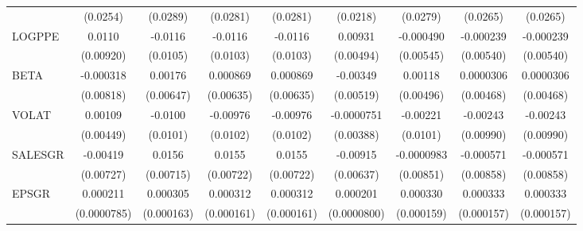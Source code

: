 \begin{table}[htbp]
\begin{tabular}{l*{8}{c}}
                    &    (0.0254)         &    (0.0289)         &    (0.0281)         &    (0.0281)         &    (0.0218)         &    (0.0279)         &    (0.0265)         &    (0.0265)         \\
LOGPPE              &      0.0110         &     -0.0116         &     -0.0116         &     -0.0116         &     0.00931\sym{*}  &   -0.000490         &   -0.000239         &   -0.000239         \\
                    &   (0.00920)         &    (0.0105)         &    (0.0103)         &    (0.0103)         &   (0.00494)         &   (0.00545)         &   (0.00540)         &   (0.00540)         \\
BETA                &   -0.000318         &     0.00176         &    0.000869         &    0.000869         &    -0.00349         &     0.00118         &   0.0000306         &   0.0000306         \\
                    &   (0.00818)         &   (0.00647)         &   (0.00635)         &   (0.00635)         &   (0.00519)         &   (0.00496)         &   (0.00468)         &   (0.00468)         \\
VOLAT               &     0.00109         &     -0.0100         &    -0.00976         &    -0.00976         &  -0.0000751         &    -0.00221         &    -0.00243         &    -0.00243         \\
                    &   (0.00449)         &    (0.0101)         &    (0.0102)         &    (0.0102)         &   (0.00388)         &    (0.0101)         &   (0.00990)         &   (0.00990)         \\
SALESGR             &    -0.00419         &      0.0156\sym{**} &      0.0155\sym{**} &      0.0155\sym{**} &    -0.00915         &  -0.0000983         &   -0.000571         &   -0.000571         \\
                    &   (0.00727)         &   (0.00715)         &   (0.00722)         &   (0.00722)         &   (0.00637)         &   (0.00851)         &   (0.00858)         &   (0.00858)         \\
EPSGR               &    0.000211\sym{***}&    0.000305\sym{*}  &    0.000312\sym{*}  &    0.000312\sym{*}  &    0.000201\sym{**} &    0.000330\sym{**} &    0.000333\sym{**} &    0.000333\sym{**} \\
                    & (0.0000785)         &  (0.000163)         &  (0.000161)         &  (0.000161)         & (0.0000800)         &  (0.000159)         &  (0.000157)         &  (0.000157)         \\

\end{tabular}
\end{table}
